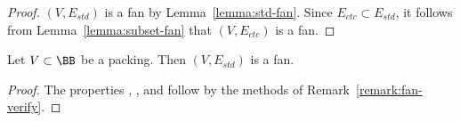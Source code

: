 \begin{proof} 
  $(V,E_{std})$ is a fan by Lemma~\ref{lemma:std-fan}.  Since
  $E_{ctc}\subset E_{std}$, it follows from
  Lemma~\ref{lemma:subset-fan} that $(V,E_{ctc})$ is a fan.
\end{proof}


\begin{lemma}\label{lemma:std-fan} 
Let $V\subset \BB$ be a packing.  
Then $(V,E_{std})$ is a fan.
\end{lemma}

\begin{proof}
The properties , , and  follow
by the methods of Remark~\ref{remark:fan-verify}.


\end{proof}
